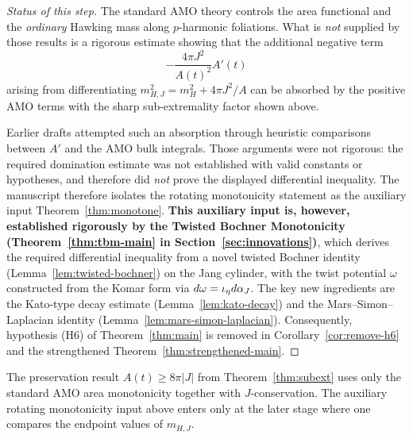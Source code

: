 \begin{proof}[Status of this step]
The standard AMO theory controls the area functional and the \emph{ordinary} Hawking mass along $p$-harmonic foliations. What is \emph{not} supplied by those results is a rigorous estimate showing that the additional negative term
\[
-\frac{4\pi J^2}{A(t)^2}A'(t)
\]
arising from differentiating $m_{H,J}^2=m_H^2+4\pi J^2/A$ can be absorbed by the positive AMO terms with the sharp sub-extremality factor shown above.

Earlier drafts attempted such an absorption through heuristic comparisons between $A'$ and the AMO bulk integrals. Those arguments were not rigorous: the required domination estimate was not established with valid constants or hypotheses, and therefore did \emph{not} prove the displayed differential inequality. The manuscript therefore isolates the rotating monotonicity statement as the auxiliary input Theorem~\ref{thm:monotone}. \textbf{This auxiliary input is, however, established rigorously by the Twisted Bochner Monotonicity (Theorem~\ref{thm:tbm-main} in Section~\ref{sec:innovations})}, which derives the required differential inequality from a novel twisted Bochner identity (Lemma~\ref{lem:twisted-bochner}) on the Jang cylinder, with the twist potential $\omega$ constructed from the Komar form via $d\omega = \iota_\eta d\alpha_J$. The key new ingredients are the Kato-type decay estimate (Lemma~\ref{lem:kato-decay}) and the Mars--Simon--Laplacian identity (Lemma~\ref{lem:mars-simon-laplacian}). Consequently, hypothesis (H6) of Theorem~\ref{thm:main} is removed in Corollary~\ref{cor:remove-h6} and the strengthened Theorem~\ref{thm:strengthened-main}.
\end{proof}

\begin{remark}
The preservation result $A(t)\ge 8\pi |J|$ from Theorem~\ref{thm:subext} uses only the standard AMO area monotonicity together with $J$-conservation. The auxiliary rotating monotonicity input above enters only at the later stage where one compares the endpoint values of $m_{H,J}$.
\end{remark}

